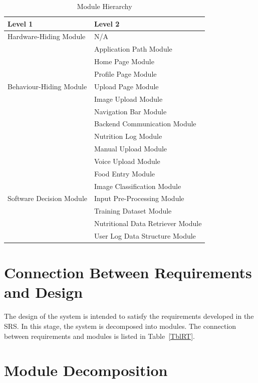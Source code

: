 \documentclass[12pt, titlepage]{article}
\begin{document}
\begin{table}[h!]
\centering
\begin{tabular}{p{} p{}}
\toprule
\textbf{Level 1} & \textbf{Level 2}\\
\midrule

{Hardware-Hiding Module} & N/A \\
\midrule

\multirow{7}{0.3\textwidth}{Behaviour-Hiding Module} & Application Path Module\\
& Home Page Module\\
& Profile Page Module\\
& Upload Page Module\\
& Image Upload Module\\
& Navigation Bar Module\\
& Backend Communication Module\\ 
& Nutrition Log Module\\
& Manual Upload Module \\
& Voice Upload Module \\
& Food Entry Module \\
\midrule

\multirow{3}{0.3\textwidth}{Software Decision Module} & Image Classification Module\\
& Input Pre-Processing Module\\
& Training Dataset Module\\
& Nutritional Data Retriever Module\\
& User Log Data Structure Module\\
\bottomrule

\end{tabular}
\caption{Module Hierarchy}
\label{TblMH}
\end{table}

\section{Connection Between Requirements and Design} \label{SecConnection}

The design of the system is intended to satisfy the requirements developed in
the SRS. In this stage, the system is decomposed into modules. The connection
between requirements and modules is listed in Table~\ref{TblRT}.

\section{Module Decomposition} \label{SecMD}
\end{document}
